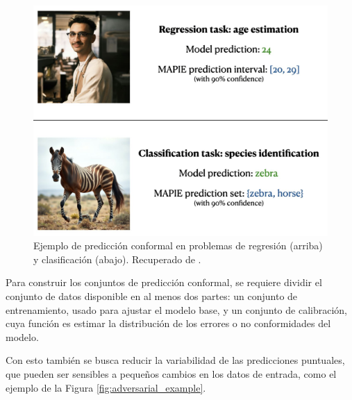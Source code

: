 \begin{figure}[h]
    \centering
    \includegraphics[width=\textwidth]{capitulos/cap_02/imagenes/educational_visual.png}
    \caption[
        Ejemplo de predicción conformal en problemas de regresión (arriba) y clasificación (abajo).
        Recuperado de \cite{mapie-docs2023}.
    ]{
        Ejemplo de predicción conformal en problemas de regresión (arriba) y clasificación (abajo).
        Recuperado de \cite{mapie-docs2023}.
    } 
    \label{fig:educational_visual}
\end{figure}


Para construir los conjuntos de predicción conformal, se requiere dividir el conjunto de datos disponible en 
al menos dos partes: un conjunto de entrenamiento, usado para ajustar el modelo base, y un conjunto de 
calibración, cuya función es estimar la distribución de los errores o no conformidades del modelo.

Con esto también se busca reducir la variabilidad de las predicciones puntuales, que pueden ser sensibles a 
pequeños cambios en los datos de entrada, como el ejemplo de la Figura \ref{fig:adversarial_example}.

